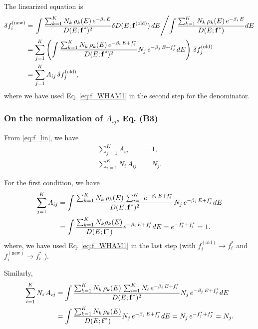 \documentclass[aip,jcp,preprint,notitlepage, superscriptaddress]{revtex4-1}
\begin{document}
The linearized equation is
\begin{align}
\delta f_i^\mathrm{(new)}
&=
\left.
  \int
  \frac
  {
    \sum_{k=1}^K N_k \, \rho_k(E) \, e^{-\beta_i \, E}
  }
  {
    D(E; \vct f^*)^2
  }
  \delta D(E; \vct f^\mathrm{(old)}) \,
  dE
\middle/
  \int
  \frac
  {
    \sum_{k=1}^K N_k \, \rho_k(E) \, e^{-\beta_i \, E}
  }
  {
    D(E; \vct f^*)
  }
  dE
\right.
%
\notag \\
&=
\sum_{j = 1}^K
\left(
\int
\frac
{
  \sum_{k=1}^K N_k \, \rho_k(E) \, e^{-\beta_i \, E + f_i^*}
}
{
  D(E; \vct f^*)^2
}
N_j \, e^{-\beta_j \, E + f_j^*}
dE
\right)
\, \delta f_j^\mathrm{(old)}
\notag \\
&=
\sum_{j = 1}^K
A_{ij} \, \delta f_j^\mathrm{(old)},
\label{eq:f_lin}
\end{align}
where we have used
Eq. \eqref{eq:f_WHAM1}
in the second step
for the denominator.




\subsubsection{On the normalization of $A_{ij}$, Eq. (B3)}


From \eqref{eq:f_lin}, we have
%
\begin{align}
  \sum_{j = 1}^K A_{ij}         &= 1,
\label{eq:Aij_normalization_j} \\
  \sum_{i = 1}^K N_i \, A_{ij}  &= N_j.
\label{eq:Aij_normalization_i}
\end{align}



For the first condition, we have
\begin{align}
\sum_{j = 1}^K
A_{ij}
&=
\int
\frac
{
  \sum_{k=1}^K N_k \, \rho_k(E) \,
  \sum_{i = 1}^K e^{-\beta_i \, E + f_i^*}
}
{
  D(E; \bm{\mathrm{f}}^*)^2
}
N_j \, e^{-\beta_j \, E + f_j^*}
dE
\notag \\
&=
\int
\frac
{
  \sum_{k=1}^K N_k \rho_k(E)
}
{
  D(E; \bm{\mathrm{f}}^*)
}
e^{-\beta_i \, E + f_i^*}
dE
=
e^{-f_i^* + f_i^*} = 1.
\notag
\end{align}
%
where,
we have used Eq. \eqref{eq:f_WHAM1}
in the last step
(with
$f_i^\mathrm{(old)} \rightarrow f_i^*$
and
$f_i^\mathrm{(new)} \rightarrow f_i^*$
).



Similarly,
\begin{align}
\sum_{i = 1}^K
N_i \, A_{ij}
&=
\int
\frac
{
  \sum_{k=1}^K N_k \, \rho_k(E) \,
  \sum_{i = 1}^K N_i \, e^{-\beta_i \, E + f_i^*}
}
{
  D(E; \bm{\mathrm{f}}^*)^2
}
N_j \, e^{-\beta_j \, E + f_j^*}
dE
\notag \\
&=
\int
\frac
{
  \sum_{k=1}^K N_k \, \rho_k(E)
}
{
  D(E; \bm{\mathrm{f}}^*)
}
N_j \, e^{-\beta_j \, E + f_j^*}
dE
=
N_j \, e^{-f_j^* + f_j^*} = N_j.
\notag
\end{align}
%
\end{document}
